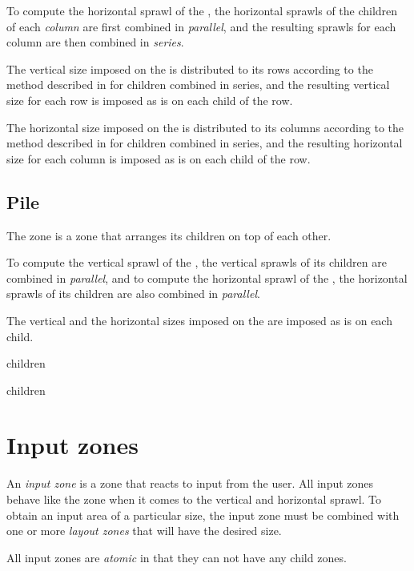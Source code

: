 To compute the horizontal sprawl of the , the horizontal
sprawls of the children of each \emph{column} are first combined in
\emph{parallel}, and the resulting sprawls for each column are then
combined in \emph{series}.

The vertical size imposed on the  is distributed to its
rows according to the method described in
 for children combined in
series, and the resulting vertical size for each row is imposed as is
on each child of the row.

The horizontal size imposed on the  is distributed to its
columns according to the method described in
 for children combined in
series, and the resulting horizontal size for each column is imposed
as is on each child of the row.

\subsection{Pile}
\label{sec-zones-layout-pile}

The  zone is a zone that arranges its children on top of
each other.

To compute the vertical sprawl of the , the vertical
sprawls of its children are combined in \emph{parallel}, and to
compute the horizontal sprawl of the , the horizontal
sprawls of its children are also combined in \emph{parallel}. 


The vertical and the horizontal sizes imposed on the 
are imposed as is on each child.


 {children}

 {\rest children}

\section{Input zones}
\label{sec-zones-input}

An \emph{input zone} is a zone that reacts to input from the user.
All input zones behave like the  zone when it comes to
the vertical and horizontal sprawl.  To obtain an input area of a
particular size, the input zone must be combined with one or more
\emph{layout zones} that will have the desired size.

All input zones are \emph{atomic} in that they can not have any child
zones.

